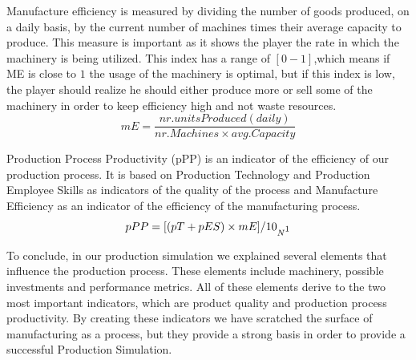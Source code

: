 Manufacture efficiency is measured by dividing the number of goods produced, on a daily basis, by the current number of machines times their average capacity to produce. This measure is important as it shows the player the rate in which the machinery is being utilized. This index has a range of $[0-1]$,which means if ME is close to $1$ the usage of the machinery is optimal, but if this index is low, the player should realize he should either produce more or sell some of the machinery in order to keep efficiency high and not waste resources.
\begin{equation}
mE= \frac{nr. units Produced(daily)}{nr. Machines\times avg. Capacity}  
\label{eq: ME}
\end{equation}

Production Process Productivity (pPP) is an indicator of the efficiency of our production  process. It is based on Production Technology and Production Employee Skills as indicators of the quality of the process and Manufacture Efficiency as an indicator of the efficiency of the manufacturing process.
\begin{equation}
pPP= [(pT + pES) \times mE]/10_{N\footnotemark}
\label{eq:PPP}
\end{equation}
 
To conclude, in our production simulation we explained several elements that influence the production process. These elements include machinery, possible investments and performance metrics. All of these elements derive to the two most important indicators, which are product quality and production process productivity. By creating these indicators we have scratched the surface of manufacturing as a process, but they provide a strong basis in order to provide a successful Production Simulation. 